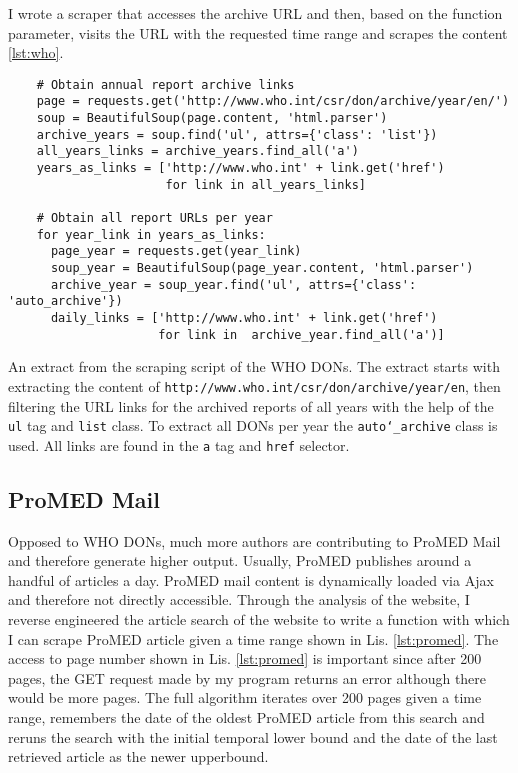 I wrote a scraper that accesses the archive URL and then, based on the function parameter, visits the URL with the requested time range and scrapes the content \ref{lst:who}.

\begin{listing}[h]
  \begin{verbatim}
    # Obtain annual report archive links
    page = requests.get('http://www.who.int/csr/don/archive/year/en/')
    soup = BeautifulSoup(page.content, 'html.parser')
    archive_years = soup.find('ul', attrs={'class': 'list'})
    all_years_links = archive_years.find_all('a')
    years_as_links = ['http://www.who.int' + link.get('href')
                      for link in all_years_links]

    # Obtain all report URLs per year
    for year_link in years_as_links:
      page_year = requests.get(year_link)
      soup_year = BeautifulSoup(page_year.content, 'html.parser')
      archive_year = soup_year.find('ul', attrs={'class': 'auto_archive'})
      daily_links = ['http://www.who.int' + link.get('href')
                     for link in  archive_year.find_all('a')]
  \end{verbatim}
  \caption{An extract from the scraping script of the WHO DONs. The extract starts with extracting the content of \textquotesingle \texttt{http://www.who.int/csr/don/archive/year/en}\textquotesingle, then filtering the URL links for the archived reports of all years with the help of the \texttt{ul} tag and \texttt{list} class. To extract all DONs per year the \texttt{auto\char`_archive} class is used. All links are found in the \texttt{a} tag and \texttt{href} selector.}
  \label{lst:who}
\end{listing}

\subsection{ProMED Mail}
Opposed to WHO DONs, much more authors are contributing to ProMED Mail and therefore generate higher output. Usually, ProMED publishes around a handful of articles a day. ProMED mail content is dynamically loaded via Ajax and therefore not directly accessible. Through the analysis of the website, I reverse engineered the article search of the website to write a function with which I can scrape ProMED article given a time range shown in Lis. \ref{lst:promed}. The access to page number shown in Lis. \ref{lst:promed} is important since after 200 pages, the GET request made by my program returns an error although there would be more pages. The full algorithm iterates over 200 pages given a time range, remembers the date of the oldest ProMED article from this search and reruns the search with the initial temporal lower bound and the date of the last retrieved article as the newer upperbound.

